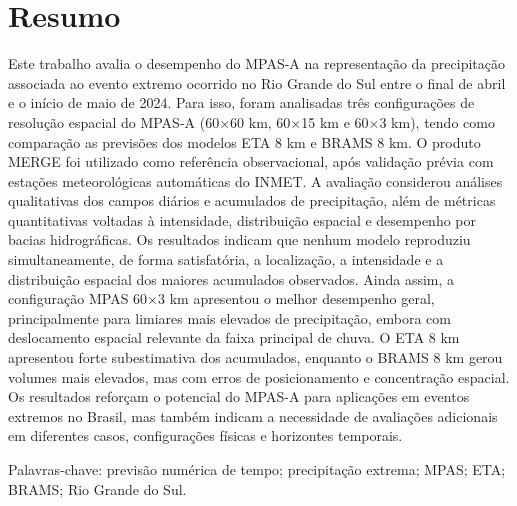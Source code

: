 \documentclass[12pt,a4paper,oneside]{book}
\begin{document}
\chapter*{Resumo}
Este trabalho avalia o desempenho do MPAS-A na representação da precipitação associada ao evento extremo ocorrido no Rio Grande do Sul entre o final de abril e o início de maio de 2024. Para isso, foram analisadas três configurações de resolução espacial do MPAS-A (60$\times$60 km, 60$\times$15 km e 60$\times$3 km), tendo como comparação as previsões dos modelos ETA 8 km e BRAMS 8 km. O produto MERGE foi utilizado como referência observacional, após validação prévia com estações meteorológicas automáticas do INMET. A avaliação considerou análises qualitativas dos campos diários e acumulados de precipitação, além de métricas quantitativas voltadas à intensidade, distribuição espacial e desempenho por bacias hidrográficas. Os resultados indicam que nenhum modelo reproduziu simultaneamente, de forma satisfatória, a localização, a intensidade e a distribuição espacial dos maiores acumulados observados. Ainda assim, a configuração MPAS 60$\times$3 km apresentou o melhor desempenho geral, principalmente para limiares mais elevados de precipitação, embora com deslocamento espacial relevante da faixa principal de chuva. O ETA 8 km apresentou forte subestimativa dos acumulados, enquanto o BRAMS 8 km gerou volumes mais elevados, mas com erros de posicionamento e concentração espacial. Os resultados reforçam o potencial do MPAS-A para aplicações em eventos extremos no Brasil, mas também indicam a necessidade de avaliações adicionais em diferentes casos, configurações físicas e horizontes temporais.

\bigskip
\noindent Palavras-chave: previsão numérica de tempo; precipitação extrema; MPAS; ETA; BRAMS; Rio Grande do Sul.
\end{document}
